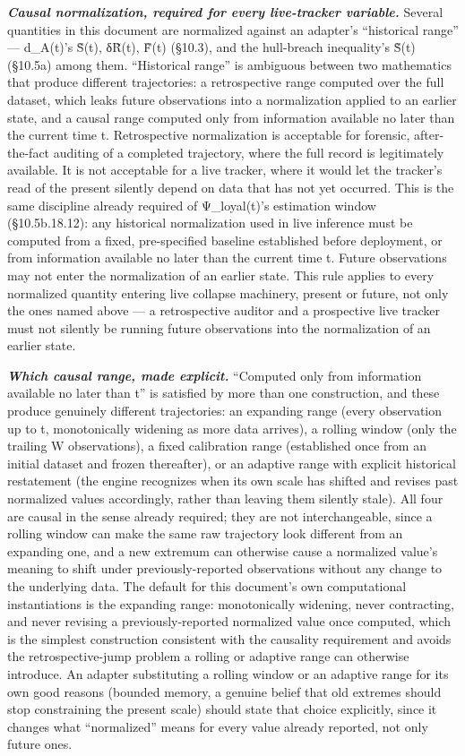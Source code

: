\documentclass[
]{article}
\begin{document}
\emph{\textbf{Causal normalization, required for every live-tracker
variable.}} Several quantities in this document are normalized against
an adapter's ``historical range'' --- d\_A(t)'s S̃(t), δR̃(t), F̃(t)
(§10.3), and the hull-breach inequality's S̃(t) (§10.5a) among them.
``Historical range'' is ambiguous between two mathematics that produce
different trajectories: a retrospective range computed over the full
dataset, which leaks future observations into a normalization applied to
an earlier state, and a causal range computed only from information
available no later than the current time t. Retrospective normalization
is acceptable for forensic, after-the-fact auditing of a completed
trajectory, where the full record is legitimately available. It is not
acceptable for a live tracker, where it would let the tracker's read of
the present silently depend on data that has not yet occurred. This is
the same discipline already required of Ψ\_loyal(t)'s estimation window
(§10.5b.18.12): any historical normalization used in live inference must
be computed from a fixed, pre-specified baseline established before
deployment, or from information available no later than the current time
t. Future observations may not enter the normalization of an earlier
state. This rule applies to every normalized quantity entering live
collapse machinery, present or future, not only the ones named above ---
a retrospective auditor and a prospective live tracker must not silently
be running future observations into the normalization of an earlier
state.

\emph{\textbf{Which causal range, made explicit.}} ``Computed only from
information available no later than t'' is satisfied by more than one
construction, and these produce genuinely different trajectories: an
expanding range (every observation up to t, monotonically widening as
more data arrives), a rolling window (only the trailing W observations),
a fixed calibration range (established once from an initial dataset and
frozen thereafter), or an adaptive range with explicit historical
restatement (the engine recognizes when its own scale has shifted and
revises past normalized values accordingly, rather than leaving them
silently stale). All four are causal in the sense already required; they
are not interchangeable, since a rolling window can make the same raw
trajectory look different from an expanding one, and a new extremum can
otherwise cause a normalized value's meaning to shift under
previously-reported observations without any change to the underlying
data. The default for this document's own computational instantiations
is the expanding range: monotonically widening, never contracting, and
never revising a previously-reported normalized value once computed,
which is the simplest construction consistent with the causality
requirement and avoids the retrospective-jump problem a rolling or
adaptive range can otherwise introduce. An adapter substituting a
rolling window or an adaptive range for its own good reasons (bounded
memory, a genuine belief that old extremes should stop constraining the
present scale) should state that choice explicitly, since it changes
what ``normalized'' means for every value already reported, not only
future ones.
\end{document}
